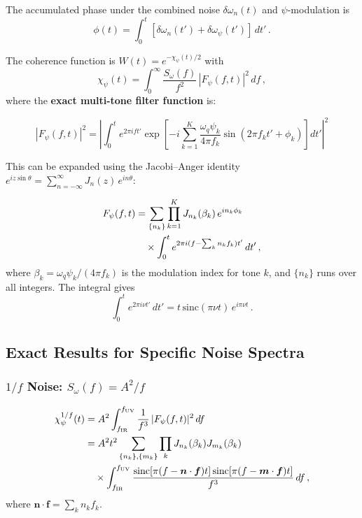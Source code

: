 \documentclass[aps,prl,twocolumn,superscriptaddress,nofootinbib,longbibliography]{revtex4-2}
\begin{document}
The accumulated phase under the combined noise $\delta\omega_n(t)$ and
$\psi$-modulation is
\begin{equation}
\phi(t) = \int_0^t [\delta\omega_n(t') + \delta\omega_\psi(t')]\,dt'\,.
\end{equation}

The coherence function is $W(t) = e^{-\chi_\psi(t)/2}$ with
\begin{equation}\label{eq:chi-psi}
\chi_\psi(t) = \int_0^\infty \frac{S_\omega(f)}{f^2}\,
|F_\psi(f,t)|^2\,df\,,
\end{equation}
where the \textbf{exact multi-tone filter function} is:

\begin{equation}\label{eq:F-exact}
\boxed{
|F_\psi(f,t)|^2 = \left|\int_0^t e^{2\pi i f t'}
\exp\!\left[-i\sum_{k=1}^K \frac{\omega_q\psi_k}{4\pi f_k}
\sin(2\pi f_k t' + \phi_k)\right] dt'\right|^2
}
\end{equation}

This can be expanded using the Jacobi--Anger identity
$e^{iz\sin\theta} = \sum_{n=-\infty}^{\infty} J_n(z)\,e^{in\theta}$:

\begin{align}
F_\psi(f,t) &= \sum_{\{n_k\}} \prod_{k=1}^K
J_{n_k}(\beta_k)\,e^{in_k\phi_k} \notag\\
&\quad \times \int_0^t
e^{2\pi i(f - \sum_k n_k f_k)t'}\,dt'\,,
\label{eq:F-expanded}
\end{align}
where $\beta_k = \omega_q\psi_k/(4\pi f_k)$ is the modulation index
for tone $k$, and $\{n_k\}$ runs over all integers. The integral gives
\begin{equation}
\int_0^t e^{2\pi i\nu t'}\,dt' = t\,\text{sinc}(\pi\nu t)\,
e^{i\pi\nu t}\,.
\end{equation}

\subsection{Exact Results for Specific Noise Spectra}

\subsubsection{$1/f$ Noise: $S_\omega(f) = A^2/f$}

\begin{align}
\chi_\psi^{1/f}(t) &= A^2 \int_{f_{\text{IR}}}^{f_{\text{UV}}}
\frac{1}{f^3}\,|F_\psi(f,t)|^2\,df \notag\\
&= A^2 t^2 \sum_{\{n_k\},\{m_k\}} \prod_k J_{n_k}(\beta_k)
J_{m_k}(\beta_k) \notag\\
&\quad \times \int_{f_{\text{IR}}}^{f_{\text{UV}}}
\frac{\text{sinc}[\pi(f-\bm{n}\cdot\bm{f})t]\,
\text{sinc}[\pi(f-\bm{m}\cdot\bm{f})t]}{f^3}\,df\,,
\label{eq:chi-1f}
\end{align}
where $\bm{n}\cdot\bm{f} = \sum_k n_k f_k$.
\end{document}
